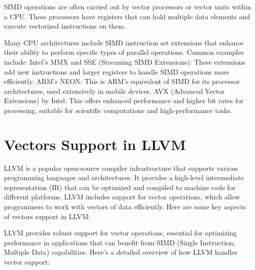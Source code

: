SIMD operations are often carried out by vector processors or vector
units within a CPU. These processors have registers that can hold
multiple data elements and execute vectorized instructions on them.

Many CPU architectures include SIMD instruction set extensions that
enhance their ability to perform specific types of parallel
operations. Common examples include: Intel’s MMX and SSE (Streaming
SIMD Extensions): These extensions add new instructions and larger
registers to handle SIMD operations more efficiently. ARM’s NEON: This
is ARM’s equivalent of SIMD for its processor architectures, used
extensively in mobile devices. AVX (Advanced Vector Extensions) by
Intel: This offers enhanced performance and higher bit rates for
processing, suitable for scientific computations and high-performance
tasks.

\section{Vectors Support in LLVM}
\label{sec:llvm-vectors}

LLVM is a popular open-source compiler infrastructure that supports
various programming languages and architectures. It provides a
high-level intermediate representation (IR) that can be optimized and
compiled to machine code for different platforms. LLVM includes
support for vector operations, which allow programmers to work with
vectors of data efficiently. Here are some key aspects of vectors
support in LLVM:

LLVM provides robust support for vector operations, essential for
optimizing performance in applications that can benefit from SIMD
(Single Instruction, Multiple Data) capabilities. Here’s a detailed
overview of how LLVM handles vector support:


